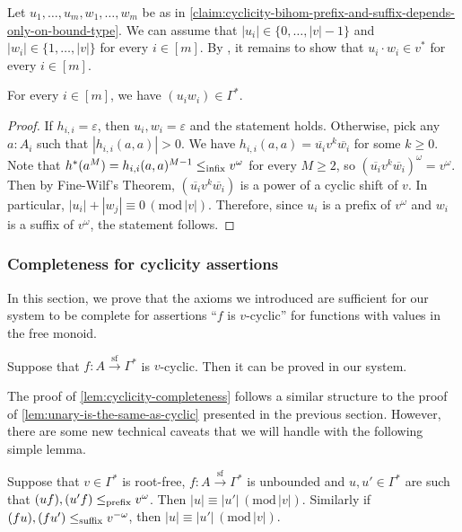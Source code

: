 Let $u_1, \dots, u_m, w_1, \dots, w_m$ be as in \cref{claim:cyclicity-bihom-prefix-and-suffix-depends-only-on-bound-type}. We can assume that $|u_i| \in \{0, \dots, |v|-1 \}$ and $|w_i| \in \{1, \dots, |v| \}$ for every $i \in [m]$. By , it remains to show that $u_i \cdot w_i \in v^*$ for every $i \in [m]$. 

\begin{claim}\label{claim:cyclicity-bihom-prefix-times-suffix-is-v}
    For every $i \in [m]$, we have $(u_i w_i) \in \Gamma^*$. 
\end{claim}

\begin{proof}
    If $h_{i,i} = \varepsilon$, then $u_i,w_i = \varepsilon$ and the statement holds. Otherwise, pick any $a : A_i$ such that $|h_{i,i}(a,a)| > 0$. We have $h_{i,i}(a,a) = \overline{u_i} v^k \overline{w_i}$ for some $k \geq 0$. Note that $h^*(a^M) = h_{i,i}(a,a)^{M-1} \leq_{\mathrm{infix}} v^\omega$ for every $M \geq 2$, so $(\overline{u_i} v^k \overline{w_i})^\omega = v^\omega$. Then by Fine-Wilf's Theorem, $(\overline{u_i} v^k \overline{w_i})$ is a power of a cyclic shift of $v$. In particular, $|u_i| + |w_j| \equiv 0 \, (\mathrm{mod} \, |v|)$. Therefore, since $u_i$ is a prefix of $v^\omega$ and $w_i$ is a suffix of $v^\omega$, the statement follows.
\end{proof}

\subsubsection{Completeness for cyclicity assertions}

In this section, we prove that the axioms we introduced are sufficient for our system to be complete for assertions ``$f$ is $v$-cyclic'' for functions with values in the free monoid.

\begin{lemma}\label{lem:cyclicity-completeness}
    Suppose that $f : A \xrightarrow{\mathrm{sf}} \Gamma^*$ is $v$-cyclic. Then it can be proved in our system.
\end{lemma}

The proof of \cref{lem:cyclicity-completeness} follows a similar structure to the proof of \cref{lem:unary-is-the-same-as-cyclic} presented in the previous section. However, there are some new technical caveats that we will handle with the following simple lemma.

\begin{lemma}\label{lem:unbounded-have-fixed-prefix-making-them-cyclic}
    Suppose that $v \in \Gamma^*$ is root-free, $f : A \xrightarrow{\mathrm{sf}} \Gamma^*$ is unbounded and $u, u' \in \Gamma^*$ are such that $(u f), (u' f) \leq_{\mathrm{prefix}} v^\omega$. Then $|u| \equiv |u'| \, (\mathrm{mod} \, |v|)$. Similarly if $(f u), (f u') \leq_{\mathrm{suffix}} v^{-\omega}$, then $|u| \equiv |u'| \, (\mathrm{mod} \, |v|)$.
\end{lemma}

